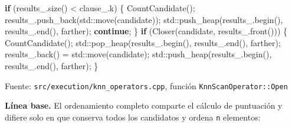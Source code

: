 \documentclass[11pt,a4paper]{article}
\newenvironment{Shaded}{}{}
\newcommand{\BuiltInTok}[1]{\textcolor[rgb]{0.00,0.50,0.00}{#1}}
\newcommand{\ControlFlowTok}[1]{\textcolor[rgb]{0.00,0.44,0.13}{\textbf{#1}}}
\newcommand{\NormalTok}[1]{#1}
\newcommand{\OperatorTok}[1]{\textcolor[rgb]{0.40,0.40,0.40}{#1}}
\newcommand{\VariableTok}[1]{\textcolor[rgb]{0.10,0.09,0.49}{#1}}
\begin{document}
\begin{Shaded}
\begin{Highlighting}[]
\ControlFlowTok{if} \OperatorTok{(}\VariableTok{results\_}\OperatorTok{.}\NormalTok{size}\OperatorTok{()} \OperatorTok{\textless{}} \VariableTok{clause\_}\OperatorTok{.}\NormalTok{k}\OperatorTok{)} \OperatorTok{\{}
\NormalTok{    CountCandidate}\OperatorTok{();}
    \VariableTok{results\_}\OperatorTok{.}\NormalTok{push\_back}\OperatorTok{(}\BuiltInTok{std::}\NormalTok{move}\OperatorTok{(}\NormalTok{candidate}\OperatorTok{));}
    \BuiltInTok{std::}\NormalTok{push\_heap}\OperatorTok{(}\VariableTok{results\_}\OperatorTok{.}\NormalTok{begin}\OperatorTok{(),} \VariableTok{results\_}\OperatorTok{.}\NormalTok{end}\OperatorTok{(),}\NormalTok{ farther}\OperatorTok{);}
    \ControlFlowTok{continue}\OperatorTok{;}
\OperatorTok{\}}
\ControlFlowTok{if} \OperatorTok{(}\NormalTok{Closer}\OperatorTok{(}\NormalTok{candidate}\OperatorTok{,} \VariableTok{results\_}\OperatorTok{.}\NormalTok{front}\OperatorTok{()))} \OperatorTok{\{}
\NormalTok{    CountCandidate}\OperatorTok{();}
    \BuiltInTok{std::}\NormalTok{pop\_heap}\OperatorTok{(}\VariableTok{results\_}\OperatorTok{.}\NormalTok{begin}\OperatorTok{(),} \VariableTok{results\_}\OperatorTok{.}\NormalTok{end}\OperatorTok{(),}\NormalTok{ farther}\OperatorTok{);}
    \VariableTok{results\_}\OperatorTok{.}\NormalTok{back}\OperatorTok{()} \OperatorTok{=} \BuiltInTok{std::}\NormalTok{move}\OperatorTok{(}\NormalTok{candidate}\OperatorTok{);}
    \BuiltInTok{std::}\NormalTok{push\_heap}\OperatorTok{(}\VariableTok{results\_}\OperatorTok{.}\NormalTok{begin}\OperatorTok{(),} \VariableTok{results\_}\OperatorTok{.}\NormalTok{end}\OperatorTok{(),}\NormalTok{ farther}\OperatorTok{);}
\OperatorTok{\}}
\end{Highlighting}
\end{Shaded}

Fuente: \texttt{src/execution/knn\_operators.cpp}, función
\texttt{KnnScanOperator::Open}

\textbf{Línea base.} El ordenamiento completo comparte el cálculo de
puntuación y difiere solo en que conserva todos los candidatos y ordena
\texttt{n} elementos:
\end{document}
